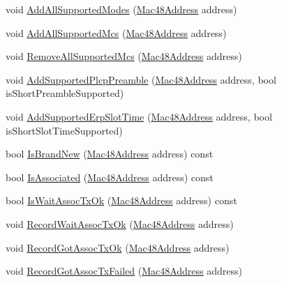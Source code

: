 \begin{DoxyCompactItemize}
\item 
void \hyperlink{classns3_1_1WifiRemoteStationManager_a4820bca619f254af7ff3ea2990563dbe}{Add\+All\+Supported\+Modes} (\hyperlink{classns3_1_1Mac48Address}{Mac48\+Address} address)
\item 
void \hyperlink{classns3_1_1WifiRemoteStationManager_a284f2ff0fb0cde5c8b08a3671712de58}{Add\+All\+Supported\+Mcs} (\hyperlink{classns3_1_1Mac48Address}{Mac48\+Address} address)
\item 
void \hyperlink{classns3_1_1WifiRemoteStationManager_a56e6fa217c536de55870bbb7166501c7}{Remove\+All\+Supported\+Mcs} (\hyperlink{classns3_1_1Mac48Address}{Mac48\+Address} address)
\item 
void \hyperlink{classns3_1_1WifiRemoteStationManager_a87909d301ec356d94d625e41d7015e5a}{Add\+Supported\+Plcp\+Preamble} (\hyperlink{classns3_1_1Mac48Address}{Mac48\+Address} address, bool is\+Short\+Preamble\+Supported)
\item 
void \hyperlink{classns3_1_1WifiRemoteStationManager_ad6f363b975424a99e6190d04078408e5}{Add\+Supported\+Erp\+Slot\+Time} (\hyperlink{classns3_1_1Mac48Address}{Mac48\+Address} address, bool is\+Short\+Slot\+Time\+Supported)
\item 
bool \hyperlink{classns3_1_1WifiRemoteStationManager_a7545940536c6520140bc7ff44b952d5d}{Is\+Brand\+New} (\hyperlink{classns3_1_1Mac48Address}{Mac48\+Address} address) const 
\item 
bool \hyperlink{classns3_1_1WifiRemoteStationManager_a1c3e9d6c0ca04ccb08793d034d9d156f}{Is\+Associated} (\hyperlink{classns3_1_1Mac48Address}{Mac48\+Address} address) const 
\item 
bool \hyperlink{classns3_1_1WifiRemoteStationManager_a6c528a30dc8733c17a928d645628369a}{Is\+Wait\+Assoc\+Tx\+Ok} (\hyperlink{classns3_1_1Mac48Address}{Mac48\+Address} address) const 
\item 
void \hyperlink{classns3_1_1WifiRemoteStationManager_a884385355dee42ba3eed2757bc485ac8}{Record\+Wait\+Assoc\+Tx\+Ok} (\hyperlink{classns3_1_1Mac48Address}{Mac48\+Address} address)
\item 
void \hyperlink{classns3_1_1WifiRemoteStationManager_a8c61f2f22d687bcb7eff7c5342906005}{Record\+Got\+Assoc\+Tx\+Ok} (\hyperlink{classns3_1_1Mac48Address}{Mac48\+Address} address)
\item 
void \hyperlink{classns3_1_1WifiRemoteStationManager_ae84c9b8961758783f13640e2300aab83}{Record\+Got\+Assoc\+Tx\+Failed} (\hyperlink{classns3_1_1Mac48Address}{Mac48\+Address} address)
\item 

\end{DoxyCompactItemize}
